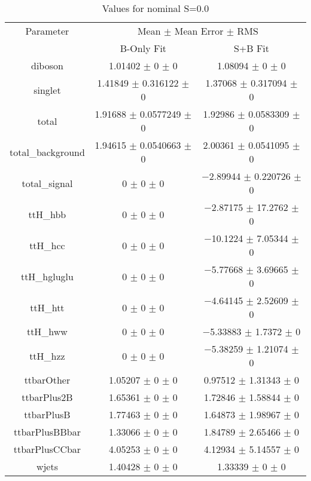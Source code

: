 \begin{table}
\centering
\caption{Values for nominal S=0.0}
\begin{tabular}{ccc}
\toprule
Parameter & \multicolumn{2}{c}{Mean $\pm$ Mean Error $\pm$ RMS}\\
 & B-Only Fit & S+B Fit\\
\midrule
diboson & \num{1.01402} $\pm$ \num{0} $\pm$ \num{0} & \num{1.08094} $\pm$ \num{0} $\pm$ \num{0}\\
singlet & \num{1.41849} $\pm$ \num{0.316122} $\pm$ \num{0} & \num{1.37068} $\pm$ \num{0.317094} $\pm$ \num{0}\\
total & \num{1.91688} $\pm$ \num{0.0577249} $\pm$ \num{0} & \num{1.92986} $\pm$ \num{0.0583309} $\pm$ \num{0}\\
total\_background & \num{1.94615} $\pm$ \num{0.0540663} $\pm$ \num{0} & \num{2.00361} $\pm$ \num{0.0541095} $\pm$ \num{0}\\
total\_signal & \num{0} $\pm$ \num{0} $\pm$ \num{0} & \num{-2.89944} $\pm$ \num{0.220726} $\pm$ \num{0}\\
ttH\_hbb & \num{0} $\pm$ \num{0} $\pm$ \num{0} & \num{-2.87175} $\pm$ \num{17.2762} $\pm$ \num{0}\\
ttH\_hcc & \num{0} $\pm$ \num{0} $\pm$ \num{0} & \num{-10.1224} $\pm$ \num{7.05344} $\pm$ \num{0}\\
ttH\_hgluglu & \num{0} $\pm$ \num{0} $\pm$ \num{0} & \num{-5.77668} $\pm$ \num{3.69665} $\pm$ \num{0}\\
ttH\_htt & \num{0} $\pm$ \num{0} $\pm$ \num{0} & \num{-4.64145} $\pm$ \num{2.52609} $\pm$ \num{0}\\
ttH\_hww & \num{0} $\pm$ \num{0} $\pm$ \num{0} & \num{-5.33883} $\pm$ \num{1.7372} $\pm$ \num{0}\\
ttH\_hzz & \num{0} $\pm$ \num{0} $\pm$ \num{0} & \num{-5.38259} $\pm$ \num{1.21074} $\pm$ \num{0}\\
ttbarOther & \num{1.05207} $\pm$ \num{0} $\pm$ \num{0} & \num{0.97512} $\pm$ \num{1.31343} $\pm$ \num{0}\\
ttbarPlus2B & \num{1.65361} $\pm$ \num{0} $\pm$ \num{0} & \num{1.72846} $\pm$ \num{1.58844} $\pm$ \num{0}\\
ttbarPlusB & \num{1.77463} $\pm$ \num{0} $\pm$ \num{0} & \num{1.64873} $\pm$ \num{1.98967} $\pm$ \num{0}\\
ttbarPlusBBbar & \num{1.33066} $\pm$ \num{0} $\pm$ \num{0} & \num{1.84789} $\pm$ \num{2.65466} $\pm$ \num{0}\\
ttbarPlusCCbar & \num{4.05253} $\pm$ \num{0} $\pm$ \num{0} & \num{4.12934} $\pm$ \num{5.14557} $\pm$ \num{0}\\
wjets & \num{1.40428} $\pm$ \num{0} $\pm$ \num{0} & \num{1.33339} $\pm$ \num{0} $\pm$ \num{0}\\
\bottomrule
\end{tabular}
\end{table}